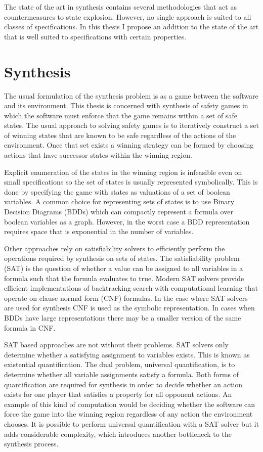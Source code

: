 The state of the art in synthesis contains several methodologies that act as countermeasures to state explosion. However, no single approach is suited to all classes of specifications. In this thesis I propose an addition to the state of the art that is well suited to specifications with certain properties.

\section{Synthesis}

The usual formulation of the synthesis problem is as a game between the software and its environment. This thesis is concerned with synthesis of safety games in which the software must enforce that the game remains within a set of safe states. The usual approach to solving safety games is to iteratively construct a set of winning states that are known to be safe regardless of the actions of the environment. Once that set exists a winning strategy can be formed by choosing actions that have successor states within the winning region.

Explicit enumeration of the states in the winning region is infeasible even on small specifications so the set of states is usually represented symbolically. This is done by specifying the game with states as valuations of a set of boolean variables. A common choice for representing sets of states is to use Binary Decision Diagrams (BDDs) which can compactly represent a formula over boolean variables as a graph. However, in the worst case a BDD representation requires space that is exponential in the number of variables.

Other approaches rely on satisfiability solvers to efficiently perform the operations required by synthesis on sets of states. The satisfiability problem (SAT) is the question of whether a value can be assigned to all variables in a formula such that the formula evaluates to true. Modern SAT solvers provide efficient implementations of backtracking search with computational learning that operate on clause normal form (CNF) formulas. In the case where SAT solvers are used for synthesis CNF is used as the symbolic representation. In cases when BDDs have large representations there may be a smaller version of the same formula in CNF.

SAT based approaches are not without their problems. SAT solvers only determine whether a satisfying assignment to variables exists. This is known as existential quantification. The dual problem, universal quantification, is to determine whether all variable assignments satisfy a formula. Both forms of quantification are required for synthesis in order to decide whether an action exists for one player that satisfies a property for all opponent actions. An example of this kind of computation would be deciding whether the software can force the game into the winning region regardless of any action the environment chooses. It is possible to perform universal quantification with a SAT solver but it adds considerable complexity, which introduces another bottleneck to the synthesis process.

